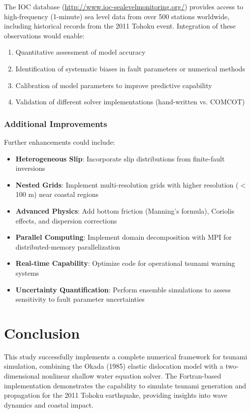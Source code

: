 \documentclass[12pt]{article}
\begin{document}
The IOC database (\url{http://www.ioc-sealevelmonitoring.org/}) provides access to high-frequency (1-minute) sea level data from over 500 stations worldwide, including historical records from the 2011 Tohoku event. Integration of these observations would enable:
\begin{enumerate}
    \item Quantitative assessment of model accuracy
    \item Identification of systematic biases in fault parameters or numerical methods
    \item Calibration of model parameters to improve predictive capability
    \item Validation of different solver implementations (hand-written vs. COMCOT)
\end{enumerate}

\subsubsection{Additional Improvements}

Further enhancements could include:
\begin{itemize}
    \item \textbf{Heterogeneous Slip}: Incorporate slip distributions from finite-fault inversions \cite{satake2013}
    \item \textbf{Nested Grids}: Implement multi-resolution grids with higher resolution ($<$100 m) near coastal regions
    \item \textbf{Advanced Physics}: Add bottom friction (Manning's formula), Coriolis effects, and dispersion corrections
    \item \textbf{Parallel Computing}: Implement domain decomposition with MPI for distributed-memory parallelization
    \item \textbf{Real-time Capability}: Optimize code for operational tsunami warning systems
    \item \textbf{Uncertainty Quantification}: Perform ensemble simulations to assess sensitivity to fault parameter uncertainties
\end{itemize}

\section{Conclusion}

This study successfully implements a complete numerical framework for tsunami simulation, combining the Okada (1985) elastic dislocation model with a two-dimensional nonlinear shallow water equation solver. The Fortran-based implementation demonstrates the capability to simulate tsunami generation and propagation for the 2011 Tohoku earthquake, providing insights into wave dynamics and coastal impact.
\end{document}
